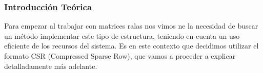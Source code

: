 \subsubsection*{Introducción Teórica}

\par Para empezar al trabajar con matrices ralas nos vimos ne la necesidad de buscar un método implementar este tipo de estructura, teniendo en cuenta un uso eficiente de los recursos del sistema. Es en este contexto que decidimos utilizar el formato CSR (Compressed Sparse Row), que vamos a proceder a explicar detalladamente más adelante.

\par 